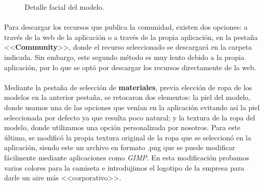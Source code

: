 \documentclass{subfiles}
\begin{document}
    \begin{figure}[H]
    \centering
    \caption{Detalle facial del modelo.}
    \label{fig:4.1.face_detail}
    \end{figure}
    
    \paragraph{}
    Para descargar los recursos que publica la comunidad, existen dos opciones: a través de la web de la aplicación o a través de la propia aplicación, en la pestaña <<\textbf{Community}>>, donde el recurso seleccionado se descargará en la carpeta indicada. Sin embargo, este segundo método es muy lento debido a la propia aplicación, por lo que se optó por descargar los recursos directamente de la web.
    
    \paragraph{}
    Mediante la pestaña de selección de \textbf{materiales}, previa elección de ropa de los modelos en la anterior pestaña, se retocaron dos elementos: la piel del modelo, donde usamos una de las opciones que venían en la aplicación evitando así la piel seleccionada por defecto ya que resulta poco natural; y la textura de la ropa del modelo, donde utilizamos una opción personalizada por nosotros. Para este último, se modificó la propia textura original de la ropa que se seleccionó en la aplicación, siendo este un archivo en formato .png que se puede modificar fácilmente mediante aplicaciones como \textit{GIMP}. En esta modificación probamos varios colores para la camiseta e introdujimos el logotipo de la empresa para darle un aire más <<corporativo>>.
\end{document}
